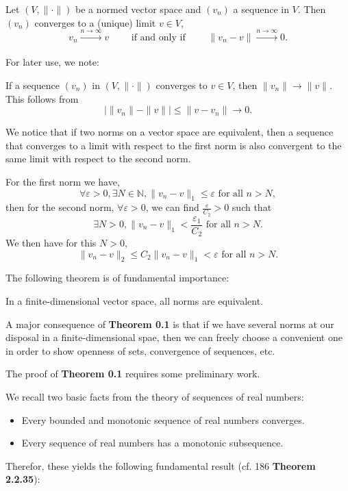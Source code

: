 \documentclass[10pt]{article}
\newcommand{\N}{\mathbb{N}}
\begin{document}
  \begin{definition}
    Let $(V,\|\cdot\|)$ be a normed vector space and $(v_{n})$ a sequence in $V$. Then $(v_{n})$ converges to a (unique) limit $v \in V$,
    \[v_{n} \xrightarrow[]{n \rightarrow \infty} v 
    \qquad 
    \text{ if and only if } \qquad \|v_{n}-v\|\xrightarrow[]{n \rightarrow \infty} 0.\]
  \end{definition}

  For later use, we note:
  \begin{remark}
    If a sequence $(v_{n})$ in $(V,\|\cdot\|)$ converges to $v \in V$, then $\|v_{n}\| \rightarrow \|v\|$. This follows from 
    \[\big|\|v_{n}\|-\|v\|\big| \leq \|v-v_{n}\| \to 0.\]
  \end{remark}

  \begin{remark}
    We notice that if two norms on a vector space are equivalent, then a sequence that converges to a limit with respect to the first norm is also convergent to the same limit with respect to the second norm.

    For the first norm we have,
    \[\forall \varepsilon > 0, \exists N  \in \N, \|v_{n}-v\|_{1} \leq \varepsilon \text{ for all }n>N,\]
    then for the second norm, $\forall \varepsilon > 0$, we can find $\frac{\varepsilon}{C_{2}} > 0$ such that
    \[\exists N>0, \|v_{n}-v\|_{1} < \frac{\varepsilon_{1}}{C_{2}} \text{ for all }n>N.\]
    We then have for this $N>0$,
    \[\|v_{n}-v\|_{2} \leq C_{2}\|v_{n}-v\|_{1} < \varepsilon \text{ for all }n>N.\]
  \end{remark}

  The following theorem is of fundamental importance:
  \begin{theorem}
    In a finite-dimensional vector space, all norms are equivalent.
  \end{theorem}

  A major consequence of \textbf{Theorem 0.1} is that if we have several norms at our disposal in a finite-dimensional spae, then we can freely choose a convenient one in order to show openness of sets, convergence of sequences, etc.

  The proof of \textbf{Theorem 0.1} requires some preliminary work.

  We recall two basic facts from the theory of sequences of real numbers:
  \begin{itemize}
    \item Every bounded and monotonic sequence of real numbers converges.
    \item Every sequence of real numbers has a monotonic subsequence.
  \end{itemize}
  Therefor, these yields the following fundamental result (cf. 186 \textbf{Theorem 2.2.35}):
  
\end{document}
